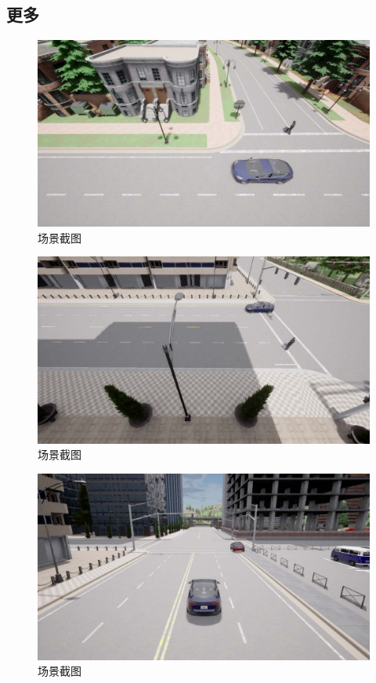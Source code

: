 \subsection {更多}
\begin{figure}[H]
	\centering
	\includegraphics[width=1.0\textwidth]{"images/场景5.pdf"}
	\caption{场景截图}
	\label{}
\end{figure}
\begin{figure}[H]
	\centering
	\includegraphics[width=1.0\textwidth]{"images/场景6.pdf"}
	\caption{场景截图}
	\label{}
\end{figure}
\begin{figure}[H]
	\centering
	\includegraphics[width=1.0\textwidth]{"images/场景7.pdf"}
	\caption{场景截图}
	\label{}
\end{figure}
